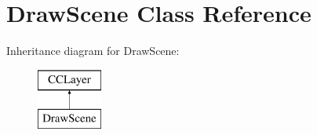 \hypertarget{interface_draw_scene}{\section{Draw\-Scene Class Reference}
\label{df/dce/interface_draw_scene}
}
Inheritance diagram for Draw\-Scene\-:\begin{figure}[H]
\begin{center}
\leavevmode
\includegraphics[height=2.000000cm]{df/dce/interface_draw_scene}
\end{center}
\end{figure}
